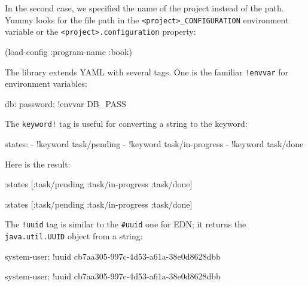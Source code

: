 \fi

In the second case, we specified the name of the project instead of the path. Yummy looks for the file path in the \verb|<project>_CONFIGURATION| environment variable or the \verb|<project>.configuration| property:


\begin{clojure}
(load-config {:program-name :book})
\end{clojure}

The library extends YAML with several tags. One is the familiar \verb|!envvar| for environment variables:


\begin{yaml}
db:
  password: !envvar DB_PASS
\end{yaml}

\noindent
The \verb|keyword!| tag is useful for converting a string to the keyword:

\begin{yaml}
states:
  - !keyword task/pending
  - !keyword task/in-progress
  - !keyword task/done
\end{yaml}

\noindent
Here is the result:

\ifnarrow

\begin{clojure}
{:states [:task/pending
          :task/in-progress
          :task/done]}
\end{clojure}

\else

\begin{clojure}
{:states [:task/pending :task/in-progress :task/done]}
\end{clojure}

\fi

The \verb|!uuid| tag is similar to the \verb|#uuid| one for EDN; it returns the \verb|java.util.UUID| object from a string:

\ifnarrow

\begin{yaml}
system-user: !uuid
    cb7aa305-997c-4d53-a61a-38e0d8628dbb
\end{yaml}

\else

\begin{yaml}
system-user: !uuid cb7aa305-997c-4d53-a61a-38e0d8628dbb
\end{yaml}

